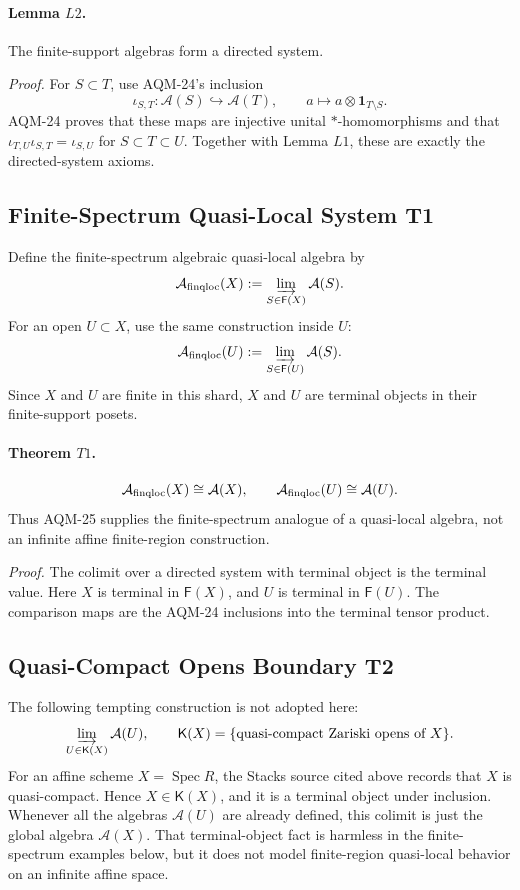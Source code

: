 \paragraph{Lemma \(L2\).}
The finite-support algebras form a directed system.

\emph{Proof.}
For \(S\subset T\), use AQM-24's inclusion
\[
  \iota_{S,T}:\mathcal A(S)\hookrightarrow\mathcal A(T),\qquad
  a\mapsto a\otimes\mathbf 1_{T\setminus S}.
\]
AQM-24 proves that these maps are injective unital \(*\)-homomorphisms and
that \(\iota_{T,U}\iota_{S,T}=\iota_{S,U}\) for \(S\subset T\subset U\).
Together with Lemma \(L1\), these are exactly the directed-system axioms.

\subsection{Finite-Spectrum Quasi-Local System T1}

Define the finite-spectrum algebraic quasi-local algebra by
\[
  \mathcal A_{\rm finqloc}(X)
  :=
  \varinjlim_{S\in\mathsf F(X)}\mathcal A(S).
\]
For an open \(U\subset X\), use the same construction inside \(U\):
\[
  \mathcal A_{\rm finqloc}(U)
  :=
  \varinjlim_{S\in\mathsf F(U)}\mathcal A(S).
\]
Since \(X\) and \(U\) are finite in this shard, \(X\) and \(U\) are terminal
objects in their finite-support posets.

\paragraph{Theorem \(T1\).}
\[
  \mathcal A_{\rm finqloc}(X)\cong\mathcal A(X),\qquad
  \mathcal A_{\rm finqloc}(U)\cong\mathcal A(U).
\]
Thus AQM-25 supplies the finite-spectrum analogue of a quasi-local algebra,
not an infinite affine finite-region construction.

\emph{Proof.}
The colimit over a directed system with terminal object is the terminal value.
Here \(X\) is terminal in \(\mathsf F(X)\), and \(U\) is terminal in
\(\mathsf F(U)\).  The comparison maps are the AQM-24 inclusions into the
terminal tensor product.

\subsection{Quasi-Compact Opens Boundary T2}

The following tempting construction is not adopted here:
\[
  \varinjlim_{U\in\mathsf K(X)}\mathcal A(U),
  \qquad
  \mathsf K(X)=\{\text{quasi-compact Zariski opens of }X\}.
\]
For an affine scheme \(X=\operatorname{Spec}R\), the Stacks source cited above
records that \(X\) is quasi-compact.  Hence \(X\in\mathsf K(X)\), and it is a
terminal object under inclusion.  Whenever all the algebras \(\mathcal A(U)\)
are already defined, this colimit is just the global algebra \(\mathcal A(X)\).
That terminal-object fact is harmless in the finite-spectrum examples below,
but it does not model finite-region quasi-local behavior on an infinite affine
space.

